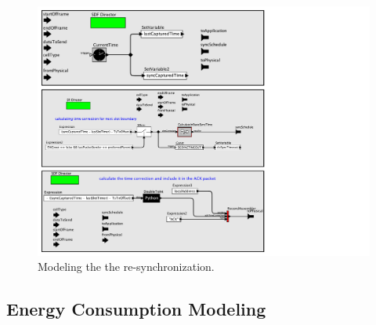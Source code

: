 \begin{figure}[t]
\centering
\includegraphics[width=0.9\columnwidth]{figures/PaperReSynchronization}
\caption{Modeling the the re-synchronization.}
\label{fig:timeCorrection}
\end{figure}


\subsection{Energy Consumption Modeling}
\label{sec:energy}


